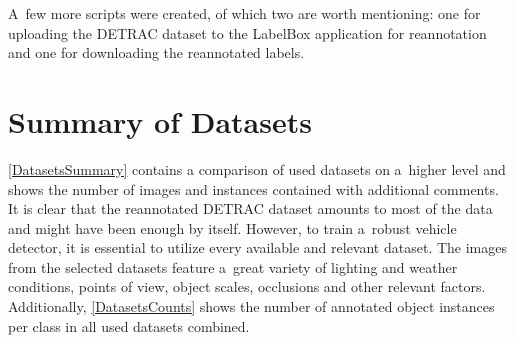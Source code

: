 A~few more scripts were created, of which two are worth mentioning: one for
uploading the DETRAC dataset to the LabelBox application for reannotation and
one for downloading the reannotated labels.


\section{Summary of Datasets}

\autoref{DatasetsSummary} contains a comparison of used datasets on a~higher
level and shows the number of images and instances contained with additional
comments. It is clear that the reannotated DETRAC dataset amounts to most of
the data and might have been enough by itself. However, to train a~robust
vehicle detector, it is essential to utilize every available and relevant
dataset. The images from the selected datasets feature a~great variety of
lighting and weather conditions, points of view, object scales, occlusions and
other relevant factors. Additionally, \autoref{DatasetsCounts} shows the number
of annotated object instances per class in all used datasets combined.

